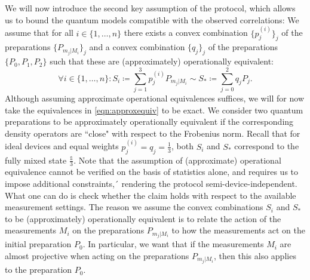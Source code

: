 We will now introduce the second key assumption of the protocol, which allows us to bound the quantum models compatible with the observed correlations: We assume that for all $i\in\{1,\dots,n\}$ there exists a convex combination $\{p_j^{(i)}\}_j$ of the preparations $\{P_{m_j\vert M_i}\}_j$ and a convex combination $\{q_j\}_j$ of the preparations $\{P_0,P_1,P_2\}$ such that these are (approximately) operationally equivalent:
\begin{equation}
\label{eqn:approxequiv}
\forall i\in\{1,\dots,n\}: S_i \coloneqq \sum_{j=1}^3 p_j^{(i)}P_{m_j\vert M_i} \sim S_* \coloneqq \sum_{j=0}^2 q_j P_j.
\end{equation}
Although assuming approximate operational equivalences suffices, we will for now take the equivalences in \ref{eqn:approxequiv} to be exact. We consider two quantum preparations to be approximately operationally equivalent if the corresponding density operators are ``close" with respect to the Frobenius norm. Recall that for ideal devices and equal weights $p_j^{(i)}=q_j=\frac{1}{3}$, both $S_i$ and $S_{*}$ correspond to the fully mixed state $\frac{\mathbb{1}}{3}$. Note that the assumption of (approximate) operational equivalence cannot be verified on the basis of statistics alone, and requires us to impose additional constraints,´ rendering the protocol semi-device-independent. What one can do is check whether the claim holds with respect to the available measurement settings. The reason we assume the convex combinations $S_i$ and $S_{*}$ to be (approximately) operationally equivalent is to relate the action of the measurements $M_i$ on the preparations $P_{m_j\vert M_i}$ to how the measurements act on the initial preparation $P_0$. In particular, we want that if the measurements $M_i$ are almost projective when acting on the preparations $P_{m_j\vert M_i}$, then this also applies to the preparation $P_0$.

